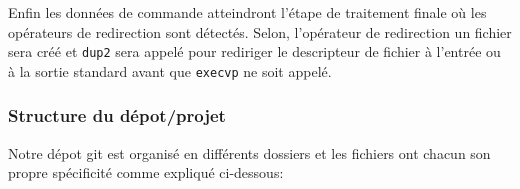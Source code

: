 \documentclass[12pt]{article}
\begin{document}
Enfin les données de commande atteindront l'étape de traitement finale où les opérateurs de redirection sont détectés. Selon, l'opérateur de redirection un fichier sera créé et \texttt{dup2} sera appelé pour rediriger le descripteur de fichier à l'entrée ou à la sortie standard avant que \texttt{execvp} ne soit appelé.

\subsubsection{Structure du dépot/projet}
Notre dépot git est organisé en différents dossiers et les fichiers ont chacun son propre spécificité comme expliqué ci-dessous:
\end{document}
